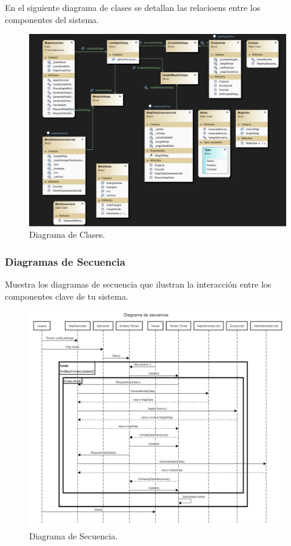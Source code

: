 En el siguiente diagrama de clases se detallan las relacioens entre los componentes del sistema.

\begin{figure}[H]
    \centering
    \includegraphics[width=1\textwidth]{img/diagrama de clases.png}
    \caption{Diagrama de Clases.}
\end{figure}
\newpage

\subsubsection{Diagramas de Secuencia}
Muestra los diagramas de secuencia que ilustran la interacción entre los componentes clave de tu sistema.

\begin{figure}[H]
    \centering
    \includegraphics[width=1\textwidth]{img/Diagrama de secuencia.png}
    \caption{Diagrama de Secuencia.}
\end{figure}
\newpage

